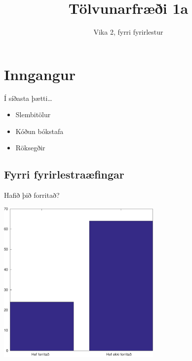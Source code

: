 \documentclass[handout]{beamer}
\title{Tölvunarfræði 1a}
\subtitle{Vika 2, fyrri fyrirlestur}
\begin{document}
\begin{frame}
\titlepage
\end{frame}

\section{Inngangur}

\begin{frame}{Í síðasta þætti\ldots}
\begin{itemize}
 \item Slembitölur
 \item Kóðun bókstafa
 \item Röksegðir
\end{itemize}
\end{frame}

\subsection{Fyrri fyrirlestraæfingar}

\begin{frame}{Hafið þið forritað?}
\begin{center}
\includegraphics[width=0.6\textwidth]{../Pics/forritunarreynsla}
\end{center}
\end{frame}
\end{document}
